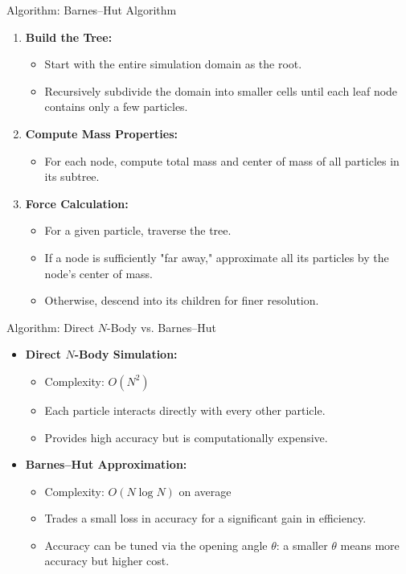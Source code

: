 \documentclass[10pt, xcolor = svgnames, aspectratio=43]{beamer} %
\begin{document}
\begin{frame}{Algorithm: Barnes--Hut Algorithm}
\begin{enumerate}
    \item \textbf{Build the Tree:}
    \begin{itemize}
        \item Start with the entire simulation domain as the root.
        \item Recursively subdivide the domain into smaller cells until each leaf node contains only a few particles.
    \end{itemize}
    \item \textbf{Compute Mass Properties:}
    \begin{itemize}
        \item For each node, compute total mass and center of mass of all particles in its subtree.
    \end{itemize}
    \item \textbf{Force Calculation:}
    \begin{itemize}
        \item For a given particle, traverse the tree.
        \item If a node is sufficiently "far away," approximate all its particles by the node's center of mass.
        \item Otherwise, descend into its children for finer resolution.
    \end{itemize}
\end{enumerate}
\end{frame}

\begin{frame}{Algorithm: Direct $N$-Body vs. Barnes--Hut}
\begin{itemize}
    \item \textbf{Direct $N$-Body Simulation:}
    \begin{itemize}
        \item Complexity: $O(N^2)$
        \item Each particle interacts directly with every other particle.
        \item Provides high accuracy but is computationally expensive.
    \end{itemize}
    
    \item \textbf{Barnes--Hut Approximation:}
    \begin{itemize}
        \item Complexity: $O(N \log N)$ on average
        \item Trades a small loss in accuracy for a significant gain in efficiency.
        \item Accuracy can be tuned via the opening angle $\theta$: 
        a smaller $\theta$ means more accuracy but higher cost.
    \end{itemize}
\end{itemize}
\end{frame}
\end{document}
